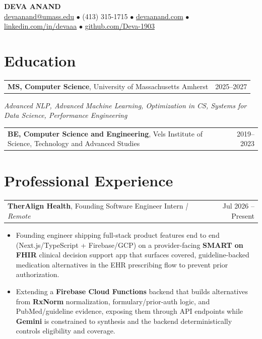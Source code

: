\documentclass[letterpaper,11pt]{article}
\makeatletter
\newcommand{\eduItem}[3]{%
  \begin{tabular*}{\textwidth}{@{}l@{\extracolsep{\fill}}r@{}}
    \textbf{#1}, #2 & #3 \\
  \end{tabular*}\par
}
\newcommand{\expItem}[4]{%
  \vspace{2pt}
  \begin{tabular*}{\textwidth}{@{}l@{\extracolsep{\fill}}r@{}}
    \textbf{#1}, #2 \textit{| #3} & #4 \\
  \end{tabular*}\par\vspace{-3pt}
}
\makeatother
\begin{document}
\begin{center}
    {\fontsize{18}{20}\selectfont\bfseries DEVA ANAND}\\ \vspace{3pt}
    {\small
    \href{mailto:devaanand@umass.edu}{devaanand@umass.edu}
    \enspace$\bullet$\enspace
    (413) 315-1715
    \enspace$\bullet$\enspace
    \href{https://devaanand.com}{devaanand.com}
    \enspace$\bullet$\enspace
    \href{https://linkedin.com/in/devaaa/}{linkedin.com/in/devaaa}
    \enspace$\bullet$\enspace
    \href{https://github.com/Deva-1903}{github.com/Deva-1903}}
\end{center}
\vspace{-8pt}

\section{Education}
\eduItem{MS, Computer Science}{University of Massachusetts Amherst}{2025--2027}
{\small\textit{Advanced NLP, Advanced Machine Learning, Optimization in CS, Systems for Data Science, Performance Engineering}}\par
\vspace{3pt}
\eduItem{BE, Computer Science and Engineering}{Vels Institute of Science, Technology and Advanced Studies}{2019--2023}

\section{Professional Experience}

\expItem{TherAlign Health}{Founding Software Engineer Intern}{Remote}{Jul 2026 -- Present}
\begin{itemize}
  \item Founding engineer shipping full-stack product features end to end (Next.js/TypeScript + Firebase/GCP) on a provider-facing \textbf{SMART on FHIR} clinical decision support app that surfaces covered, guideline-backed medication alternatives in the EHR prescribing flow to prevent prior authorization.
  \item Extending a \textbf{Firebase Cloud Functions} backend that builds alternatives from \textbf{RxNorm} normalization, formulary/prior-auth logic, and PubMed/guideline evidence, exposing them through API endpoints while \textbf{Gemini} is constrained to synthesis and the backend deterministically controls eligibility and coverage.
\end{itemize}
\end{document}

